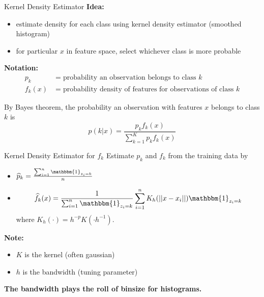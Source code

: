 \documentclass[12pt]{beamer}
\newcommand{\ind}{\mathbbm{1}}
\begin{document}
\begin{frame}{Kernel Density Estimator}
  \textbf{Idea:}
  \begin{itemize}
  \item estimate density for each class using kernel density estimator (smoothed histogram)
  \item for particular $x$ in feature space, select whichever class is more probable
  \end{itemize}

  \vspace{.1in}
  
    \textbf{Notation:}
  \begin{align*}
    p_k &= \text{probability an observation belongs to class } k\\
    f_k(x) &= \text{probability density of features for observations of class } k
  \end{align*}

\vspace{.1in}
  
  By Bayes theorem, the probability an observation with features $x$ belongs to class $k$ is
  \begin{equation*}
    p(k|x) = \frac{p_k f_k(x)}{\sum_{k=1}^K p_k f_k(x)}
  \end{equation*}

\end{frame}



\begin{frame}{Kernel Density Estimator for $f_k$}
  Estimate $p_k$ and $f_k$ from the training data by
  \begin{itemize}
  \item $\widehat{p}_k = \frac{\sum_{i=1}^n \ind_{z_i=k}}{n}$
  \item 
  \begin{equation*}
    \widehat{f}_k(x) = \frac{1}{\sum_{i=1}^n \ind_{z_i=k}}\sum_{i=1}^{n} K_h(||x-x_i||)\ind_{z_i=k}
  \end{equation*}
where $K_h(\cdot) = h^{-p}K(\cdot h^{-1})$.
  \end{itemize}

\vspace{.2in}
  
  \textbf{Note:}
  \begin{itemize}
  \item $K$ is the kernel (often gaussian)
  \item $h$ is the bandwidth (tuning parameter)
  \end{itemize}

  \vspace{.3in}
  
  \begin{center}
    \textbf{The bandwidth plays the roll of binsize for histograms.}
  \end{center}

  
\end{frame}
\end{document}

